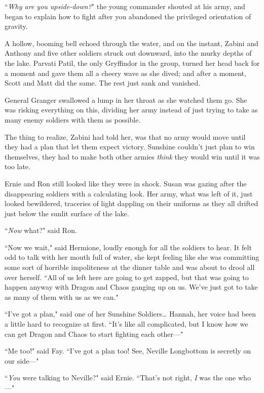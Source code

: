 ``\emph{Why are you upside-down?}" the young commander shouted at his army, and began to explain how to fight after you abandoned the privileged orientation of gravity.

\later

A hollow, booming bell echoed through the water, and on the instant, Zabini and Anthony and five other soldiers struck out downward, into the murky depths of the lake. Parvati Patil, the only Gryffindor in the group, turned her head back for a moment and gave them all a cheery wave as she dived; and after a moment, Scott and Matt did the same. The rest just sank and vanished.

General Granger swallowed a lump in her throat as she watched them go. She was risking everything on this, dividing her army instead of just trying to take as many enemy soldiers with them as possible.

The thing to realize, Zabini had told her, was that no army would move until they had a plan that let them expect victory. Sunshine couldn't just plan to win themselves, they had to make both other armies \emph{think} they would win until it was too late.

Ernie and Ron still looked like they were in shock. Susan was gazing after the disappearing soldiers with a calculating look. Her army, what was left of it, just looked bewildered, traceries of light dappling on their uniforms as they all drifted just below the sunlit surface of the lake.

``\emph{Now} what?" said Ron.

``Now we wait," said Hermione, loudly enough for all the soldiers to hear. It felt odd to talk with her mouth full of water, she kept feeling like she was committing some sort of horrible impoliteness at the dinner table and was about to drool all over herself. ``All of us left here are going to get zapped, but that was going to happen anyway with Dragon and Chaos ganging up on us. We've just got to take as many of them with us as we can."

``I've got a plan," said one of her Sunshine Soldiers{\ldots} Hannah, her voice had been a little hard to recognize at first. ``It's like all complicated, but I know how we can get Dragon and Chaos to start fighting each other—"

``Me too!" said Fay. ``I've got a plan too! See, Neville Longbottom is secretly on our side—"

``\emph{You} were talking to Neville?" said Ernie. ``That's not right, \emph{I} was the one who—"

